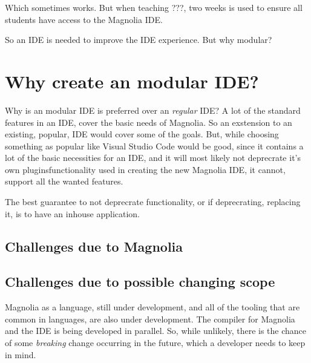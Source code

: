 \documentclass[runningheads]{llncs}
\begin{document}
Which sometimes works. But when teaching ???, two weeks is used to ensure all
students have access to the Magnolia IDE.


So an IDE is needed to improve the IDE experience. But why modular?

\section{Why create an modular IDE?}
Why is an modular IDE is preferred over an \textit{regular} IDE? A lot of the
standard features
in an IDE, cover the basic needs of Magnolia. So an exstension to an existing,
popular, IDE would cover some of the goals.
But, while choosing something as popular like Visual Studio Code would be good,
since it contains a lot of the basic necessities for an IDE, and it will most
likely not deprecrate it's own plugins\/functionality used in creating the new
Magnolia IDE, it cannot, support all the wanted features. %

The best guarantee to not deprecrate functionality, or if deprecrating,
replacing it, is to have an inhouse application.

\subsection{Challenges due to Magnolia}

\subsection{Challenges due to possible changing scope}
Magnolia as a language, still under development, and all of the tooling that are
common in languages, are also under development. The compiler for Magnolia and
the IDE is being developed in parallel. So, while unlikely, there is the chance
of some \textit{breaking} change occurring in the future, which a developer
needs to keep in mind.
\end{document}
